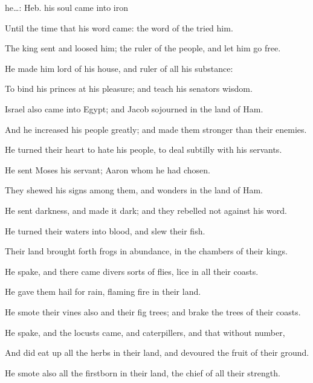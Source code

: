 {{he…: Heb. his soul came into iron}
\par }{\Q {}Until the
time that his
word
came: the
word of the
{}
tried him.
\par }{\Q {}The
king
sent and
loosed him;
{} the
ruler of the
people, and let him go
free.
\par }{\Q {}He
made him
lord of his
house, and
ruler of all his
substance:
\par }{\Q {}To
bind his
princes at his
pleasure; and teach his
senators
wisdom.
\par }{\Q {}Israel also
came into
Egypt; and
Jacob
sojourned in the
land of
Ham.
\par }{\Q {}And he
increased his
people
greatly; and made them
stronger than their
enemies.
\par }{\BB \par }{\Q {}He
turned their
heart to
hate his
people, to deal
subtilly with his
servants.
\par }{\Q {}He
sent
Moses his
servant;
{}
Aaron whom he had
chosen.
\par }{\Q {}They
shewed his
signs among them, and
wonders in the
land of
Ham.
\par }{\Q {}He
sent
darkness, and made it
dark; and they
rebelled not against his
word.
\par }{\Q {}He
turned their
waters into
blood, and
slew their
fish.
\par }{\Q {}Their
land brought
forth
frogs in
abundance, in the
chambers of their
kings.
\par }{\Q {}He
spake, and there
came divers sorts of
flies,
{}
lice in all their
coasts.
\par }{\Q {}He
gave them
hail for
rain,
{}
flaming
fire in their
land.
\par }{\Q {}He
smote their
vines also and their fig
trees; and
brake the
trees of their
coasts.
\par }{\Q {}He
spake, and the
locusts
came, and
caterpillers, and that without
number,
\par }{\Q {}And did eat
up all the
herbs in their
land, and
devoured the
fruit of their
ground.
\par }{\Q {}He
smote also all the
firstborn in their
land, the
chief of all their
strength.
}

